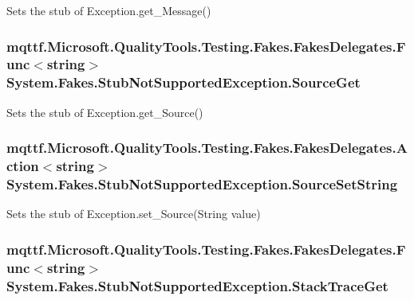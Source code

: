 Sets the stub of Exception.\-get\-\_\-\-Message()

\hypertarget{class_system_1_1_fakes_1_1_stub_not_supported_exception_a50082f380d30e6895cdbf2df97ebcd71}{
\subsubsection[{Source\-Get}]{\setlength{\rightskip}{0pt plus 5cm}mqttf.\-Microsoft.\-Quality\-Tools.\-Testing.\-Fakes.\-Fakes\-Delegates.\-Func$<$string$>$ System.\-Fakes.\-Stub\-Not\-Supported\-Exception.\-Source\-Get}}\label{class_system_1_1_fakes_1_1_stub_not_supported_exception_a50082f380d30e6895cdbf2df97ebcd71}


Sets the stub of Exception.\-get\-\_\-\-Source()

\hypertarget{class_system_1_1_fakes_1_1_stub_not_supported_exception_a3a8572e239d2b6e9f3d00ec6cbcc6829}{
\subsubsection[{Source\-Set\-String}]{\setlength{\rightskip}{0pt plus 5cm}mqttf.\-Microsoft.\-Quality\-Tools.\-Testing.\-Fakes.\-Fakes\-Delegates.\-Action$<$string$>$ System.\-Fakes.\-Stub\-Not\-Supported\-Exception.\-Source\-Set\-String}}\label{class_system_1_1_fakes_1_1_stub_not_supported_exception_a3a8572e239d2b6e9f3d00ec6cbcc6829}


Sets the stub of Exception.\-set\-\_\-\-Source(\-String value)

\hypertarget{class_system_1_1_fakes_1_1_stub_not_supported_exception_ad6b3b74ee00383c6669750b14035d9b7}{
\subsubsection[{Stack\-Trace\-Get}]{\setlength{\rightskip}{0pt plus 5cm}mqttf.\-Microsoft.\-Quality\-Tools.\-Testing.\-Fakes.\-Fakes\-Delegates.\-Func$<$string$>$ System.\-Fakes.\-Stub\-Not\-Supported\-Exception.\-Stack\-Trace\-Get}}\label{class_system_1_1_fakes_1_1_stub_not_supported_exception_ad6b3b74ee00383c6669750b14035d9b7}


